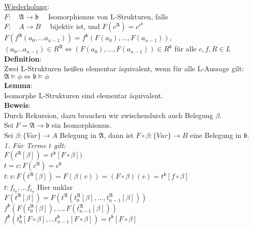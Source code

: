 \documentclass[a4paper]{scrartcl}
\newcommand{\mfa}{\mathfrak{A}}  %
\begin{document}
	\underline{Wiederholung}:\\ 
		$F: \quad \mfa \rightarrow \mathfrak{b} \quad$ Isomorphismus von L-Strukturen, falls \\
		$F: \quad A \rightarrow B \quad $ bijektiv ist, und $F(c^\mfa)= c^{c^\mathfrak{b}}$ \\
		$F(f^{\mfa}(a_0,\dots a_{n-1})) = f^{\mathfrak{b}} (F(a_0), \dots ,F(a_{n-1}))$, \\
		$(a_0 \dots a_{n-1}) \in R^{\mfa} \Leftrightarrow  (F(a_0), \dots ,F(a_{n-1})) \in R^{\mathfrak{b}}$ für alle $c,f,R \in L$\\ 
	
	\textbf{Definition}: \\
		Zwei L-Strukturen heißen elementar äquivalent, wenn für alle L-Aussage gilt: \\
		$\mfa \models \phi \Leftrightarrow \mathfrak{b} \models \phi $\\
	
	\textbf{Lemma}: \\
		Isomorphe L-Strukturen sind elementar äquivalent.\\
	
	\textbf{Beweis}: \\ 
		Durch Rekursion, dazu brauchen wir zwischendurch auch Belegung $\beta$. \\
		Sei $F =  \mfa \rightarrow \mathfrak{b} $ ein Isomorphismus.\\
		Sei $\beta : \lbrace Var \rbrace \rightarrow A $ Belegung in $\mfa$, dann ist $F \circ \beta : \lbrace Var \rbrace \rightarrow B $ eine Belegung in $\mathfrak{b}$.\\
	
	\textit{1. Für Terme $t$ gilt:} \medskip \\
		$F(t^{\mfa}\left[ \beta \right]) = t^{\mathfrak{b}}\left[ F \circ \beta \right])$ \medskip \\
		$t= c: F(c^{\mfa}) = c^{\mathfrak{b}}$ \medskip \\
		$t: v: F(t^{\mfa}\left[ \beta \right]) = F(\beta (v))= (F \circ \beta)(v) = t^{\mathfrak{b}}\left[ f \circ \beta \right]$ \medskip \\
		$t: f_{t_0} , \dots f_{t_n}$ Hier unklar \medskip  \\ 		
		$F(t^{\mfa}\left[\beta \right]) = F(t^{\mfa}(t^{\mfa}_{0}\left[\beta \right], \dots , t^{\mfa}_{n-1}\left[\beta \right] )) $ \medskip \\
		$f^{\mathfrak{b}}(F(t^{\mfa}_{0}\left[\beta \right]), \dots , F(t^{\mfa}_{n-1}\left[\beta \right]))$ \medskip \\
		$f^{\mathfrak{b}}(t^{\mathfrak{b}}_{0}\left[ F\circ \beta \right], \dots t^{\mathfrak{b}}_{n-1}\left[ F\circ \beta \right]) = t^{\mathfrak{b}}\left[ F\circ \beta \right]$\medskip \\
	
\end{document}
